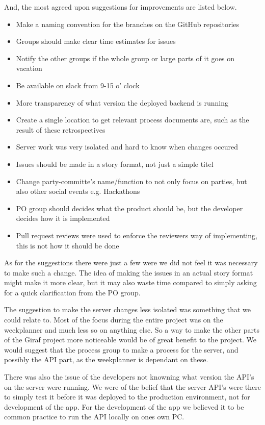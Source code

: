 And, the most agreed upon suggestions for improvements are listed below.
\begin{itemize}
  \item Make a naming convention for the branches on the GitHub repositories
  \item Groups should make clear time estimates for issues
  \item Notify the other groups if the whole group or large parts of it goes on vacation
  \item Be available on slack from 9-15 o' clock
  \item More transparency of what version the deployed backend is running
  \item Create a single location to get relevant process documents are, such as the result of these retrospectives
  \item Server work was very isolated and hard to know when changes occured
  \item Issues should be made in a story format, not just a simple titel
  \item Change party-committe's name/function to not only focus on parties, but also other social events e.g. Hackathons
  \item PO group should decides what the product should be, but the developer decides how it is implemented
  \item Pull request reviews were used to enforce the reviewers way of implementing, this is not how it should be done
\end{itemize}

As for the suggestions there were just a few were we did not feel it was necessary to make such a change.
The idea of making the issues in an actual story format might make it more clear, but it may also waste time compared to simply asking for a quick clarification from the PO group. 

The suggestion to make the server changes less isolated was something that we could relate to.
Most of the focus during the entire project was on the weekplanner and much less so on anything else.
So a way to make the other parts of the Giraf project more noticeable would be of great benefit to the project.
We would suggest that the process group to make a process for the server, and possibly the API part, as the weekplanner is dependant on these.

There was also the issue of the developers not knowning what version the API's on the server were running.
We were of the belief that the server API's were there to simply test it before it was deployed to the production environment, not for development of the app.
For the development of the app we believed it to be common practice to run the API locally on ones own PC.

